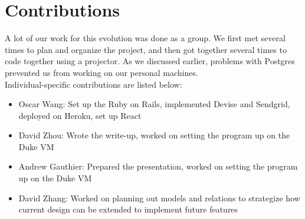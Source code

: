 \documentclass{article}
\begin{document}
\section{Contributions}
A lot of our work for this evolution was done as a group.  We first met several times to plan and organize the project, and then got together several times to code together using a projector.  As we discussed earlier, problems with Postgres prevented us from working on our personal machines.\\
Individual-specific contributions are listed below:
\begin{itemize}
\item{Oscar Wang: Set up the Ruby on Rails, implemented Devise and Sendgrid, deployed on Heroku, set up React}
\item{David Zhou: Wrote the write-up, worked on setting the program up on the Duke VM}
\item{Andrew Gauthier: Prepared the presentation, worked on setting the program up on the Duke VM}
\item{David Zhang: Worked on planning out models and relations to strategize how current design can be extended to implement future features }
\end{itemize}
\end{document}
